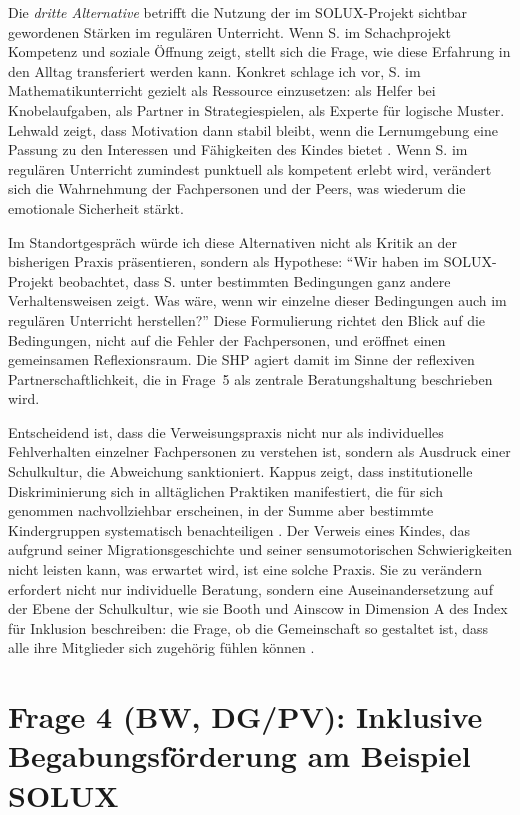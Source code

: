 \documentclass[ngerman, a4paper]{article}
\begin{document}
Die \textit{dritte Alternative} betrifft die Nutzung der im SOLUX-Projekt
sichtbar gewordenen Stärken im regulären Unterricht. Wenn S. im Schachprojekt
Kompetenz und soziale Öffnung zeigt, stellt sich die Frage, wie diese
Erfahrung in den Alltag transferiert werden kann. Konkret schlage ich vor,
S. im Mathematikunterricht gezielt als Ressource einzusetzen: als Helfer bei
Knobelaufgaben, als Partner in Strategiespielen, als Experte für logische
Muster. Lehwald zeigt, dass Motivation dann stabil bleibt, wenn die
Lernumgebung eine Passung zu den Interessen und Fähigkeiten des Kindes bietet
\parencite{lehwald2017motivation}. Wenn S. im regulären Unterricht zumindest
punktuell als kompetent erlebt wird, verändert sich die Wahrnehmung der
Fachpersonen und der Peers, was wiederum die emotionale Sicherheit stärkt.

Im Standortgespräch würde ich diese Alternativen nicht als Kritik an der
bisherigen Praxis präsentieren, sondern als Hypothese: \enquote{Wir haben im
SOLUX-Projekt beobachtet, dass S. unter bestimmten Bedingungen ganz andere
Verhaltensweisen zeigt. Was wäre, wenn wir einzelne dieser Bedingungen auch
im regulären Unterricht herstellen?} Diese Formulierung richtet den Blick
auf die Bedingungen, nicht auf die Fehler der Fachpersonen, und eröffnet einen
gemeinsamen Reflexionsraum. Die SHP agiert damit im Sinne der reflexiven
Partnerschaftlichkeit, die in Frage~5 als zentrale Beratungshaltung
beschrieben wird.

Entscheidend ist, dass die Verweisungspraxis nicht nur als individuelles
Fehlverhalten einzelner Fachpersonen zu verstehen ist, sondern als Ausdruck
einer Schulkultur, die Abweichung sanktioniert. Kappus zeigt, dass
institutionelle Diskriminierung sich in alltäglichen Praktiken manifestiert,
die für sich genommen nachvollziehbar erscheinen, in der Summe aber bestimmte
Kindergruppen systematisch benachteiligen \parencite{kappus2010migration}. Der
Verweis eines Kindes, das aufgrund seiner Migrationsgeschichte und seiner
sensumotorischen Schwierigkeiten nicht leisten kann, was erwartet wird, ist
eine solche Praxis. Sie zu verändern erfordert nicht nur individuelle
Beratung, sondern eine Auseinandersetzung auf der Ebene der Schulkultur,
wie sie Booth und Ainscow in Dimension A des Index für Inklusion beschreiben:
die Frage, ob die Gemeinschaft so gestaltet ist, dass alle ihre Mitglieder
sich zugehörig fühlen können \parencite{booth2019index}.


\section{Frage 4 (BW, DG/PV): Inklusive Begabungsförderung am Beispiel SOLUX}
\label{sec:frage4}
 
\end{document}
